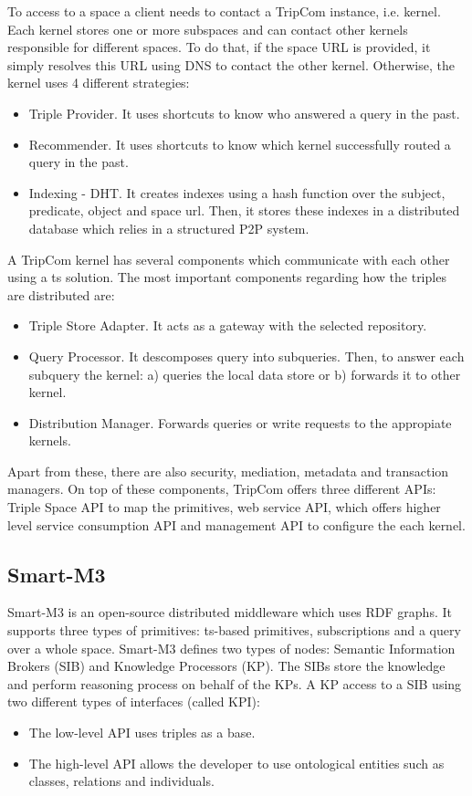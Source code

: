 To access to a space a client needs to contact a TripCom instance, i.e. kernel.
Each kernel stores one or more subspaces and can contact other kernels responsible for different spaces.
To do that, if the space URL is provided, it simply resolves this URL using DNS to contact the other kernel.
Otherwise, the kernel uses 4 different strategies:
\begin{itemize}
  \item Triple Provider. It uses shortcuts to know who answered a query in the past.
  \item Recommender. It uses shortcuts to know which kernel successfully routed a query in the past.
  \item Indexing - DHT.
	It creates indexes using a hash function over the subject, predicate, object and space url.
	Then, it stores these indexes in a distributed database which relies in a structured P2P system. %
\end{itemize}


A TripCom kernel has several components which communicate with each other using a \acl{ts} solution.
The most important components regarding how the triples are distributed are:
\begin{itemize}
  \item Triple Store Adapter.
	It acts as a gateway with the selected repository.
  \item Query Processor. It descomposes query into subqueries.
	Then, to answer each subquery the kernel: a) queries the local data store or b) forwards it to other kernel.
  \item Distribution Manager.
	Forwards queries or write requests to the appropiate kernels.
\end{itemize}
Apart from these, there are also security, mediation, metadata and transaction managers.
On top of these components, TripCom offers three different APIs:
Triple Space API to map the primitives,
web service API, which offers higher level service consumption API
and management API to configure the each kernel.



\subsection{Smart-M3}

Smart-M3 is an open-source distributed middleware which uses RDF graphs. %
It supports three types of primitives: \acl{ts}-based primitives, subscriptions and a query over a whole space.
Smart-M3 defines two types of nodes: Semantic Information Brokers (SIB) and Knowledge Processors (KP).
The SIBs store the knowledge and perform reasoning process on behalf of the KPs.
A KP access to a SIB using two different types of interfaces (called KPI):
\begin{itemize}
  \item The low-level API uses triples as a base.
  \item The high-level API allows the developer to use ontological entities such as classes, relations and individuals.
\end{itemize}


